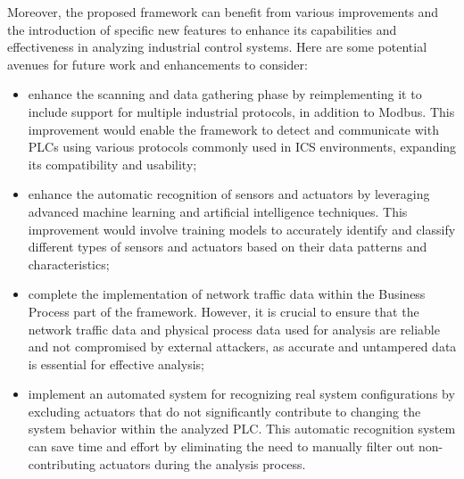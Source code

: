 Moreover, the proposed framework can benefit from various improvements and the introduction of specific new features to enhance its capabilities and effectiveness in analyzing industrial control systems. Here are some potential avenues for future work and enhancements to consider:

\begin{itemize}
	\item enhance the scanning and data gathering phase by reimplementing it to include support for multiple industrial protocols, in addition to Modbus. This improvement would enable the framework to detect and communicate with PLCs using various protocols commonly used in ICS environments, expanding its compatibility and usability;
	
	\item enhance the automatic recognition of sensors and actuators by leveraging advanced machine learning and artificial intelligence techniques. This improvement would involve training models to accurately identify and classify different types of sensors and actuators based on their data patterns and characteristics;
	
	\item complete the implementation of network traffic data within the Business Process part of the framework. However, it is crucial to ensure that the network traffic data and physical process data used for analysis are reliable and not compromised by external attackers, as accurate and untampered data is essential for effective analysis;
	
	\item implement an automated system for recognizing real system configurations by excluding actuators that do not significantly contribute to changing the system behavior within the analyzed PLC. This automatic recognition system can save time and effort by eliminating the need to manually filter out non-contributing actuators during the analysis process.
\end{itemize}

\vfill
